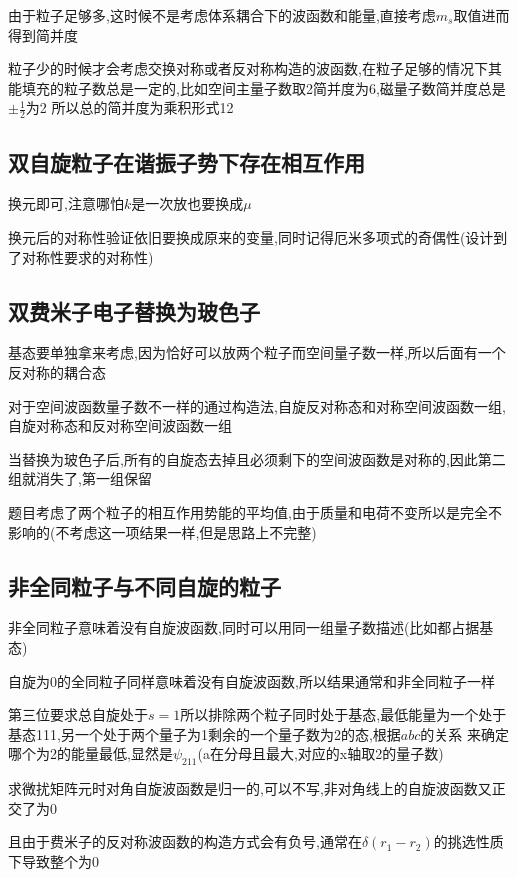             由于粒子足够多,这时候不是考虑体系耦合下的波函数和能量,直接考虑$m_{s}$取值进而得到简并度

            粒子少的时候才会考虑交换对称或者反对称构造的波函数,在粒子足够的情况下其能填充的粒子数总是一定的,比如空间主量子数取2简并度为6,磁量子数简并度总是$\pm\frac{1}{2}$为2
            所以总的简并度为乘积形式12
        
        
        \subsection{双自旋粒子在谐振子势下存在相互作用}
            换元即可,注意哪怕$k$是一次放也要换成$\mu$

            换元后的对称性验证依旧要换成原来的变量,同时记得厄米多项式的奇偶性(设计到了对称性要求的对称性)

        \subsection{双费米子电子替换为玻色子}
            基态要单独拿来考虑,因为恰好可以放两个粒子而空间量子数一样,所以后面有一个反对称的耦合态

            对于空间波函数量子数不一样的通过构造法,自旋反对称态和对称空间波函数一组,自旋对称态和反对称空间波函数一组

            当替换为玻色子后,所有的自旋态去掉且必须剩下的空间波函数是对称的,因此第二组就消失了,第一组保留

            题目考虑了两个粒子的相互作用势能的平均值,由于质量和电荷不变所以是完全不影响的(不考虑这一项结果一样,但是思路上不完整)

        \subsection{非全同粒子与不同自旋的粒子}
            非全同粒子意味着没有自旋波函数,同时可以用同一组量子数描述(比如都占据基态)

            自旋为0的全同粒子同样意味着没有自旋波函数,所以结果通常和非全同粒子一样

            第三位要求总自旋处于$s=1$所以排除两个粒子同时处于基态,最低能量为一个处于基态111,另一个处于两个量子为1剩余的一个量子数为2的态,根据$abc$的关系
            来确定哪个为2的能量最低,显然是$\psi_{211}$(a在分母且最大,对应的x轴取2的量子数)

            求微扰矩阵元时对角自旋波函数是归一的,可以不写,非对角线上的自旋波函数又正交了为0

            且由于费米子的反对称波函数的构造方式会有负号,通常在$\delta(r_{1}-r_{2})$的挑选性质下导致整个为0 


